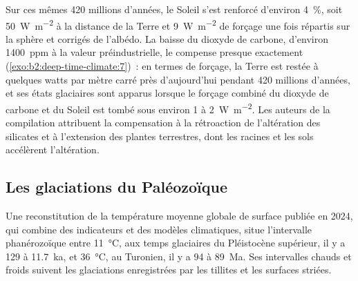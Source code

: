 \begin{omfigure}
\par{}
\end{omfigure}

Sur ces mêmes 420 millions d'années, le Soleil s'est renforcé d'environ \qty{4}{\percent}, soit
\qty{50}{W.m^{-2}} à la distance de la Terre et \qty{9}{W.m^{-2}} de forçage une fois répartis sur la
sphère et corrigés de l'albédo. La baisse du dioxyde de carbone, d'environ \qty{1400}{ppm} à la valeur
préindustrielle, le compense presque exactement (\cref{exo:b2:deep-time-climate:7})~: en termes de
forçage, la Terre est restée à quelques watts par mètre carré près d'aujourd'hui pendant 420 millions d'années,
et ses états glaciaires sont apparus lorsque le forçage combiné du dioxyde de carbone et du Soleil est tombé sous environ 1
à \qty{2}{W.m^{-2}}. Les auteurs de la compilation attribuent la compensation à la rétroaction de l'altération
des silicates et à l'extension des plantes terrestres, dont les racines et les sols accélèrent l'altération.

\subsection*{Les glaciations du Paléozoïque}

Une reconstitution de la température moyenne globale de surface publiée en 2024, qui combine des indicateurs
et des modèles climatiques, situe l'intervalle phanérozoïque entre \qty{11}{\celsius}, aux temps glaciaires du
Pléistocène supérieur, il y a 129 à 11.7~ka, et \qty{36}{\celsius}, au Turonien, il y a 94 à \qty{89}{Ma}.
Ses intervalles chauds et froids suivent les glaciations enregistrées par les tillites et les surfaces striées.


